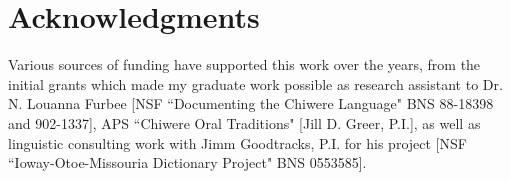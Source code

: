 \documentclass[output=paper]{LSP/langsci}
\begin{document}
\section*{Acknowledgments}
Various sources of funding have supported this work over the years, from the initial grants which made my graduate work possible as research assistant to Dr. N. Louanna Furbee [NSF ``Documenting the Chiwere Language" BNS 88-18398 and 902-1337], APS ``Chiwere Oral Traditions" [Jill D. Greer, P.I.], as well as linguistic consulting work with Jimm Goodtracks, P.I. for his  project [NSF ``Ioway-Otoe-Missouria Dictionary Project" BNS 0553585].
\end{document}
